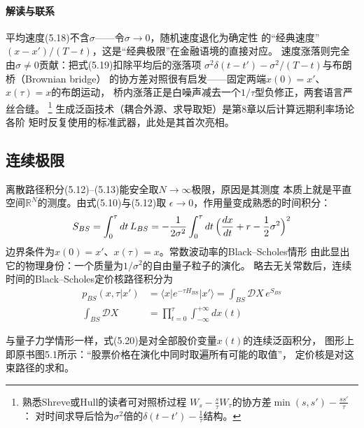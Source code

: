 \paragraph{解读与联系}
平均速度(5.18)不含$\sigma$——令$\sigma\to0$，随机速度退化为确定性
的“经典速度”$(x-x')/(T-t)$，这是“经典极限”在金融语境的直接对应。
速度涨落则完全由$\sigma\neq0$贡献：把式(5.19)扣除平均后的涨落项
$\sigma^{2}\delta(t-t')-\sigma^{2}/(T-t)$与布朗桥（Brownian bridge）
的协方差对照很有启发——固定两端$x(0)=x'$、$x(\tau)=x$的布朗运动，
桥内涨落正是白噪声减去一个$1/\tau$型负修正，两套语言严丝合缝。
\footnote{熟悉Shreve或Hull的读者可对照桥过程
$W_{s}-\frac{s}{\tau}W_{\tau}$的协方差$\min(s,s')-\frac{ss'}{\tau}$：
对时间求导后恰为$\sigma^{2}$倍的$\delta(t-t')-\frac{1}{\tau}$结构。}
生成泛函技术（耦合外源、求导取矩）是第8章以后计算远期利率场论各阶
矩时反复使用的标准武器，此处是其首次亮相。

\subsection*{连续极限}

离散路径积分(5.12)--(5.13)能安全取$N\to\infty$极限，原因是其测度
本质上就是平直空间$\mathbb{R}^{N}$的测度。由式(5.10)与(5.12)取
$\epsilon\to0$，作用量变成熟悉的时间积分：
\begin{equation*}
S_{BS}=\int_{0}^{\tau}dt\,L_{BS}
=-\frac{1}{2\sigma^{2}}\int_{0}^{\tau}dt\,
\Bigl(\frac{dx}{dt}+r-\frac{1}{2}\sigma^{2}\Bigr)^{2}
\end{equation*}
边界条件为$x(0)=x'$、$x(\tau)=x$。常数波动率的Black--Scholes情形
由此显出它的物理身份：一个质量为$1/\sigma^{2}$的自由量子粒子的演化。
略去无关常数后，连续时间的Black--Scholes定价核路径积分为
\begin{align*}
p_{BS}(x,\tau\vert x')&=\langle x\vert e^{-\tau H_{BS}}\vert x'\rangle
=\int_{BS}\mathcal{D}X\,e^{S_{BS}}\\
\int_{BS}\mathcal{D}X&=\prod_{t=0}^{\tau}\int_{-\infty}^{+\infty}dx(t)
\tag{5.20}
\end{align*}


与量子力学情形一样，式(5.20)是对全部股价变量$x(t)$的连续泛函积分，
图形上即原书图5.1所示：“股票价格在演化中同时取遍所有可能的取值”，
定价核是对这束路径的求和。

